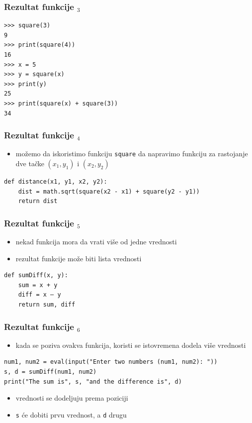 \documentclass[utf8,compress]{beamer}
\begin{document}
\begin{frame}[fragile]
  \frametitle{Rezultat funkcije $_3$}
\begin{verbatim}
>>> square(3)
9
>>> print(square(4))
16
>>> x = 5
>>> y = square(x)
>>> print(y)
25
>>> print(square(x) + square(3))
34
\end{verbatim}
\end{frame}

\begin{frame}[fragile]
  \frametitle{Rezultat funkcije $_4$}
  \begin{itemize}
    \item možemo da iskoristimo funkciju \texttt{square} da napravimo funkciju za rastojanje dve tačke $(x_1,y_1)$ i $(x_2,y_2)$
  \end{itemize}
\begin{verbatim}
def distance(x1, y1, x2, y2):
    dist = math.sqrt(square(x2 - x1) + square(y2 - y1))
    return dist
\end{verbatim}
\end{frame}

\begin{frame}[fragile]
  \frametitle{Rezultat funkcije $_5$}
  \begin{itemize}
    \item nekad funkcija mora da vrati više od jedne vrednosti
    \item rezultat funkcije može biti lista vrednosti
  \end{itemize}
\begin{verbatim}
def sumDiff(x, y):
    sum = x + y
    diff = x – y
    return sum, diff
\end{verbatim}
\end{frame}

\begin{frame}[fragile,shrink=5]
  \frametitle{Rezultat funkcije $_6$}
  \begin{itemize}
    \item kada se poziva ovakva funkcija, koristi se istovremena dodela više vrednosti
  \end{itemize}
\begin{verbatim}
num1, num2 = eval(input("Enter two numbers (num1, num2): "))
s, d = sumDiff(num1, num2)
print("The sum is", s, "and the difference is", d)
\end{verbatim}
  \begin{itemize}
    \item vrednosti se dodeljuju prema poziciji
    \item \texttt{s} će dobiti prvu vrednost, a \texttt{d} drugu
  \end{itemize}
\end{frame}
\end{document}
